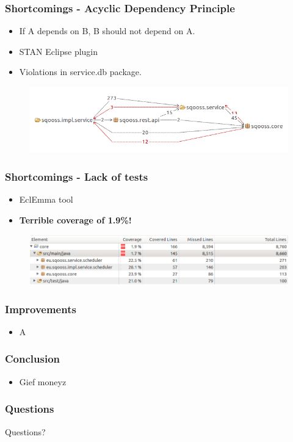\documentclass{beamer}
\begin{document}
\begin{frame}
    \frametitle{Shortcomings - Acyclic Dependency Principle}
    \begin{itemize}
        \item If A depends on B, B should not depend on A.
        \item STAN Eclipse plugin        
        \item Violations in service.db package.
    \end{itemize}
    
    \begin{figure}
    	\centering
    	\includegraphics[width=\textwidth]{../img/cycle1.png}
    \end{figure}
\end{frame}

\begin{frame}
    \frametitle{Shortcomings - Lack of tests}
    \begin{itemize}
        \item EclEmma tool
        \item \textbf{Terrible coverage of 1.9\%!}
        
    \end{itemize}
    \begin{figure}
    	\centering
    		\includegraphics[width=\textwidth]{../img/coreCoverageBefore.png}
    \end{figure}
\end{frame}

\begin{frame}
    \frametitle{Improvements}
    \begin{itemize}
        \item A
    \end{itemize}
\end{frame}

\begin{frame}
    \frametitle{Conclusion}
    \begin{itemize}
    		\item Gief moneyz
    \end{itemize}
\end{frame}

\begin{frame}
    \frametitle{Questions}
    \hspace{.25\linewidth}
    \Huge{Questions?}
\end{frame}
\end{document}

